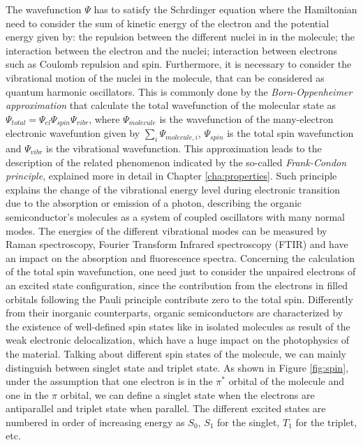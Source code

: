 \documentclass  [
  paper    = a4,
  BCOR     = 10mm,
  twoside,
  fontsize = 12pt,
  fleqn,
  toc      = bibnumbered,
  toc      = listofnumbered,
  numbers  = noendperiod,
  headings = normal,
  listof   = leveldown,
  version  = 3.03
]                                       {scrreprt}
\begin{document}
The wavefunction $\Psi$ has to satisfy the Schrdinger equation where the Hamiltonian need to consider the sum of kinetic energy of the electron and the potential energy given by: the repulsion between the different nuclei in in the molecule; the interaction between the electron and the nuclei; interaction between electrons such as Coulomb repulsion and spin. Furthermore, it is necessary to consider the vibrational motion of the nuclei in the molecule, that can be considered as quantum harmonic oscillators. This is commonly done by the \emph{Born-Oppenheimer approximation} that calculate the total wavefunction of the molecular state as $\Psi_{total}=\Psi_{el}\Psi_{spin}\Psi_{vibr}$, where $\Psi_{molecule}$ is the wavefunction of the many-electron electronic wavefuntion given by $\sum_{i}\Psi_{molecule,i}$, $\Psi_{spin}$ is the total spin wavefunction and $\Psi_{vibr}$ is the vibrational wavefunction. This approximation leads to the description of the related phenomenon indicated by the so-called \emph{Frank-Condon principle}, explained more in detail in Chapter \ref{cha:properties}. Such principle explains the change of the vibrational energy level during electronic transition due to the absorption or emission of a photon, describing the organic semiconductor's molecules as a system of coupled oscillators with many normal modes. The energies of the different vibrational modes can be measured by Raman spectroscopy, Fourier Transform Infrared spectroscopy (FTIR) and have an impact on the absorption and fluorescence spectra. Concerning the calculation of the total spin wavefunction, one need just to consider the unpaired electrons of an excited state configuration, since the contribution from the electrons in filled orbitals following the Pauli principle contribute zero to the total spin. Differently from their inorganic counterparts, organic semiconductors are characterized by the existence of well-defined spin states like in isolated molecules as result of the weak electronic delocalization, which have a huge impact on the photophysics of the material. Talking about different spin states of the molecule, we can mainly distinguish between singlet state and triplet state. As shown in Figure \ref{fig:spin}, under the assumption that one electron is in the $\pi^*$ orbital of the molecule and one in the $\pi$ orbital, we can define a singlet state when the electrons are antiparallel and triplet state when parallel. The different excited states are numbered in order of increasing energy as $S_0$, $S_1$ for the singlet, $T_1$ for the triplet, etc.\\
\end{document}
